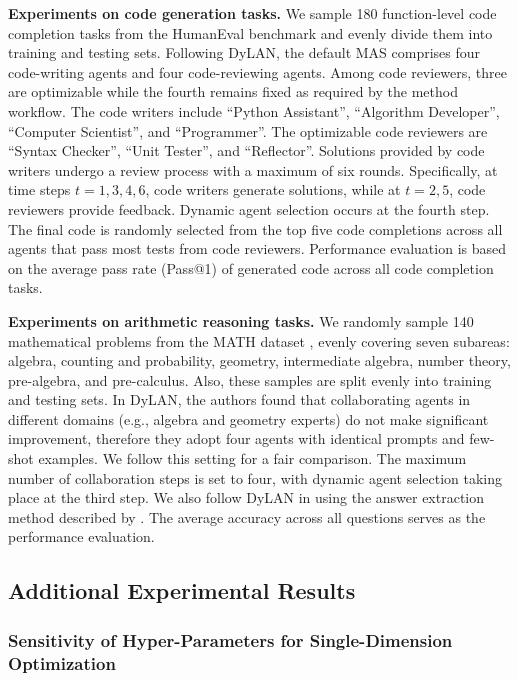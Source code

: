 \noindent \textbf{Experiments on code generation tasks.} We sample 180 function-level code completion tasks from the HumanEval benchmark \cite{human-eval} and evenly divide them into training and testing sets.
Following DyLAN, the default MAS comprises four code-writing agents and four code-reviewing agents. Among code reviewers, three are optimizable while the fourth remains fixed as required by the method workflow.  The code writers include ``Python Assistant”, ``Algorithm Developer”, ``Computer Scientist”, and ``Programmer”. The optimizable code reviewers are ``Syntax Checker”, ``Unit Tester”, and ``Reflector”. Solutions provided by code writers undergo a review process with a maximum of six rounds. Specifically, at time steps $t = 1, 3, 4, 6$, code writers generate solutions, while at $t = 2, 5$, code reviewers provide feedback.
Dynamic agent selection occurs at the fourth step.
The final code is randomly selected from the top five code completions across all agents that pass
most tests from code reviewers. Performance evaluation is based on the average pass rate (Pass@1) of generated code across all code completion tasks.


\noindent \textbf{Experiments on arithmetic reasoning tasks.}  We randomly sample 140 mathematical problems from the MATH dataset \cite{hendrycksmath2021}, evenly covering seven subareas: algebra, counting and probability, geometry, intermediate algebra, number theory, pre-algebra, and pre-calculus. Also, these samples are split evenly into training and testing sets. In DyLAN, the authors found that collaborating agents in different domains (e.g., algebra and geometry experts) do not make significant improvement, therefore they adopt four agents with identical prompts and few-shot examples. We follow this setting for a fair comparison. The maximum number of collaboration steps is set to four, with dynamic agent selection taking place at the third step. We also follow DyLAN in using the answer extraction method described by \cite{hendrycksmath2021}. The average accuracy across all questions serves as the performance evaluation.



\subsection{Additional Experimental Results}


\subsubsection{Sensitivity of Hyper-Parameters for Single-Dimension Optimization}\label{sec:hyper_single}


